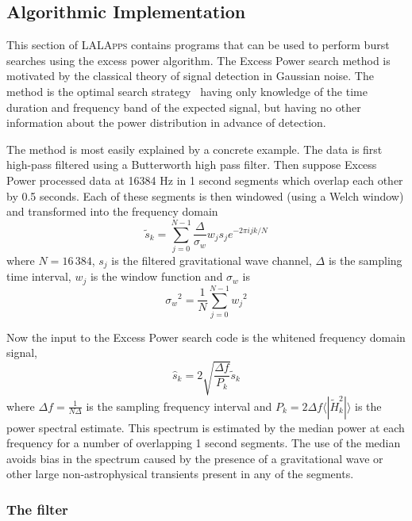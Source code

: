 \subsection{Algorithmic Implementation}

This section of \textsc{LALApps} contains programs that can be used to
perform burst searches using the excess power algorithm.   
The Excess Power search method is motivated by the classical theory of
signal detection in Gaussian noise.  The method is the optimal search
strategy~\cite{Anderson:2000yy} having only knowledge of the time duration
and frequency band of the expected signal,  but having no other
information about the power distribution in advance of detection. 

The method is most easily explained by a concrete example.
The data is first high-pass filtered using a Butterworth high pass filter.
Then suppose Excess Power processed data at 16384 Hz in 1 second segments 
which overlap each other by 0.5 seconds. Each of these segments is then 
windowed (using a Welch window) and transformed into the frequency domain 
\begin{equation}
\tilde{s}_k =  \sum_{j=0}^{N-1}\frac{\Delta}{\sigma_w}w_js_j e^{-2 \pi i j k /N}
\end{equation}
where $N=16\, 384$, $s_j$ is the filtered gravitational 
wave channel, $\Delta$ is the sampling time interval, $w_j$ is the window
function and $\sigma_w$ is  
\begin{equation}
{\sigma_w}^2 = \frac{1}{N}\sum_{j=0}^{N-1}{w_j}^2
\end{equation}

Now the input to the Excess Power search code is the whitened 
frequency domain signal,
\begin{equation}
\hat{s}_k = 2\sqrt{\frac{\Delta f}{P_k}}\tilde{s}_k
\end{equation}
where $\Delta f = \frac{1}{N\Delta}$ is the sampling frequency interval and 
$P_k = 2 \Delta f\langle|\tilde{H}_k^2| \rangle$ is the 
power spectral estimate.  This spectrum is estimated by the median
power at each frequency for a number of overlapping 1 second segments.
The use of the median avoids bias in the spectrum caused by the
presence of a gravitational wave or other large non-astrophysical
transients present in any of the segments.   

\subsubsection{The filter}

